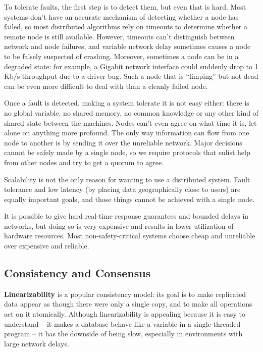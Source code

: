 \documentclass{article}
\begin{document}
    To tolerate faults, the first step is to detect them, but even that is hard. Most systems don’t have an accurate mechanism of detecting whether a node has failed, so most distributed algorithms rely on timeouts to determine whether a remote node is still available. However, timeouts can’t distinguish between network and node failures, and variable network delay sometimes causes a node to be falsely suspected of crashing. Moreover, sometimes a node can be in a degraded state: for example, a Gigabit network interface could suddenly drop to 1 Kb/s throughput due to a driver bug. Such a node that is ``limping” but not dead can be even more difficult to deal with than a cleanly failed node.
    
    Once a fault is detected, making a system tolerate it is not easy either: there is no global variable, no shared memory, no common knowledge or any other kind of shared state between the machines. Nodes can’t even agree on what time it is, let alone on anything more profound. The only way information can flow from one node to another is by sending it over the unreliable network. Major decisions cannot be safely made by a single node, so we require protocols that enlist help from other nodes and try to get a quorum to agree.
    
    Scalability is not the only reason for wanting to use a distributed system. Fault tolerance and low latency (by placing data geographically close to users) are equally important goals, and those things cannot be achieved with a single node.
    
    It is possible to give hard real-time response guarantees and bounded delays in networks, but doing so is very expensive and results in lower utilization of hardware resources. Most non-safety-critical systems choose cheap and unreliable over expensive and reliable.
    
    \subsection{Consistency and Consensus }
    \textbf{Linearizability} is a popular consistency model: its goal is to make replicated data appear as though there were only a single copy, and to make all operations act on it atomically. Although linearizability is appealing because it is easy to understand -- it makes a database behave like a variable in a single-threaded program -- it has the downside of being slow, especially in environments with large network delays.
    
\end{document}
